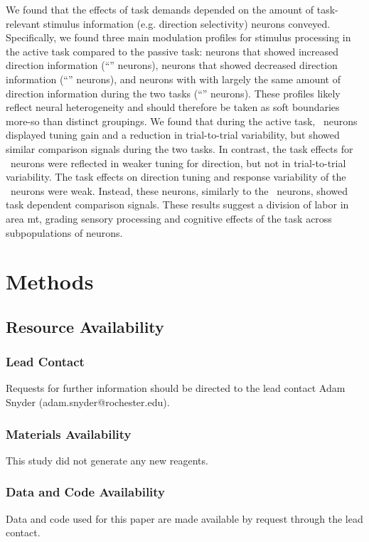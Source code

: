 We found that the effects of task demands depended on the amount of task-relevant stimulus information (e.g. direction selectivity) neurons conveyed. 
Specifically, we found three main modulation profiles for stimulus processing in the active task compared to the passive task: neurons that showed increased direction information (``\enhanced'' neurons), neurons that showed decreased direction information (``\suppressed'' neurons), and neurons with with largely the same amount of direction information during the two tasks (``\consistent'' neurons). These profiles likely reflect neural heterogeneity and should therefore be taken as soft boundaries more-so than distinct groupings.\label{rev:het1}
We found that during the active task, \enhanced\ neurons displayed tuning gain and a reduction in trial-to-trial variability, but showed similar comparison signals during the two tasks. 
In contrast, the task effects for \suppressed\ neurons were reflected in weaker tuning for direction, but not in trial-to-trial variability. 
The task effects on direction tuning and response variability of the \consistent\ neurons were weak. 
Instead, these neurons, similarly to the \suppressed\ neurons, showed task dependent comparison signals.
These results suggest a division of labor in area \gls{mt}, grading sensory processing and cognitive effects of the task across subpopulations of neurons.

\section{Methods}
\label{sec:methods}

\subsection*{Resource Availability}
\subsubsection*{Lead Contact }
Requests for further information should be directed to the lead contact Adam Snyder (adam.snyder@rochester.edu).

\subsubsection*{Materials Availability }
This study did not generate any new reagents. 

\subsubsection*{Data and Code Availability}
Data and code used for this paper are made available by request through the lead contact.


